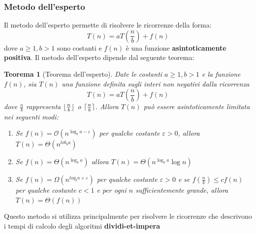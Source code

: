 \documentclass[12pt]{article}
\newtheorem{Teorema}{Teorema}[subsection]
\DeclarePairedDelimiter\ceil{\lceil}{\rceil}
\DeclarePairedDelimiter\floor{\lfloor}{\rfloor}
\begin{document}
\subsubsection{Metodo dell'esperto}
Il metodo dell'esperto permette di risolvere le ricorrenze della forma:
$$T(n) = aT(\frac{n}{b}) + f(n)$$
dove $a \geq 1, b >1$ sono costanti e $f(n)$ è una funzione \textbf{asintoticamente positiva}.
Il metodo dell'esperto dipende dal seguente teorema:
\begin{Teorema}[Teorema dell'esperto]
    Date le costanti $a \geq 1, b > 1$ e la funzione $f(n)$, sia $T(n)$ una funzione definita sugli interi non negativi dalla ricorrenza
    $$T(n) = aT(\frac{n}{b}) + f(n)$$
    dove $\frac{n}{b}$ rappresenta $\floor{\frac{n}{b}}$ o $\ceil{\frac{n}{b}}$. Allora $T(n)$ può essere asintoticamente limitata nei seguenti modi:
    \begin{enumerate}
        \item Se $f(n) = \mathcal{O}(n^{\log_b{a - \varepsilon}})$ per qualche costante $\varepsilon > 0$, allora $T(n) = \Theta(n^{lob_b{a}})$
        \item Se $f(n) = \Theta(n^{\log_b{a}})$ allora $T(n) = \Theta(n^{\log_b{a}} \log{n})$
        \item Se $f(n) = \Omega(n^{log_b{a} + \varepsilon})$ per qualche costante $\varepsilon > 0$ e se $f(\frac{n}{b}) \leq c f(n)$ per qualche costante $c < 1$ e per ogni
        $n$ sufficientemente grande, allora $T(n) = \Theta(f(n))$
    \end{enumerate}
\end{Teorema}
Questo metodo si utilizza principalmente per risolvere le ricorrenze che descrivono i tempi di calcolo degli algoritmi
\textbf{dividi-et-impera}
\end{document}
